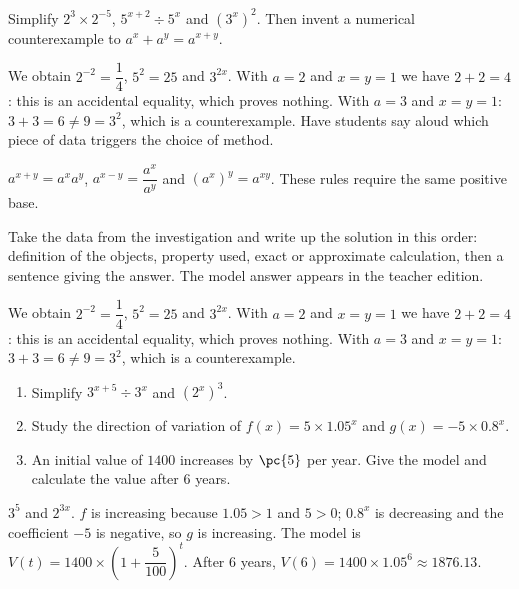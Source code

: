\begin{activity}
Simplify $2^3\times2^{-5}$, $5^{x+2}\div5^x$ and $(3^x)^2$. Then invent a numerical counterexample to $a^x+a^y=a^{x+y}$.

\end{activity}
\begin{solution}We obtain $2^{-2}=\dfrac14$, $5^2=25$ and $3^{2x}$. With $a=2$ and $x=y=1$ we have $2+2=4$: this is an accidental equality, which proves nothing. With $a=3$ and $x=y=1$: $3+3=6\neq9=3^{2}$, which is a counterexample. Have students say aloud which piece of data triggers the choice of method.\end{solution}

\begin{summary}$a^{x+y}=a^xa^y$, $a^{x-y}=\dfrac{a^x}{a^y}$ and $(a^x)^y=a^{xy}$. These rules require the same positive base.\end{summary}

\begin{example}
Take the data from the investigation and write up the solution in this order: definition of the objects, property used, exact or approximate calculation, then a sentence giving the answer. The model answer appears in the teacher edition.
\end{example}
\begin{solution}We obtain $2^{-2}=\dfrac14$, $5^2=25$ and $3^{2x}$. With $a=2$ and $x=y=1$ we have $2+2=4$: this is an accidental equality, which proves nothing. With $a=3$ and $x=y=1$: $3+3=6\neq9=3^{2}$, which is a counterexample.\end{solution}

\begin{exercise}[essential]
\begin{enumerate}\item Simplify $3^{x+5}\div3^x$ and $(2^x)^3$.\item Study the direction of variation of $f(x)=5\times\num{1,05}^x$ and $g(x)=-5\times\num{0,8}^x$.\item An initial value of $1400$ increases by $\pc{5}$ per year. Give the model and calculate the value after $6$ years.\end{enumerate}
\end{exercise}
\begin{solution}$3^5$ and $2^{3x}$. $f$ is increasing because $\num{1,05}>1$ and $5>0$; $\num{0,8}^x$ is decreasing and the coefficient $-5$ is negative, so $g$ is increasing. The model is $V(t)=1400\times\left(1+\dfrac{5}{100}\right)^t$. After $6$ years, $V(6)=1400\times\num{1,05}^6\approx\num{1876,13}$.\end{solution}

